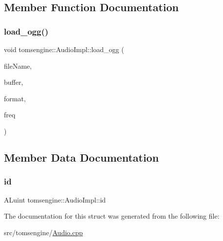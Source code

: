 \subsection{Member Function Documentation}
\mbox{\label{structtomsengine_1_1_audio_impl_a95a18a49f4741b70d83adfde334be19a}} 
\subsubsection{\texorpdfstring{load\+\_\+ogg()}{load\_ogg()}}
{\footnotesize\ttfamily void tomsengine\+::\+Audio\+Impl\+::load\+\_\+ogg (\begin{DoxyParamCaption}\item[{std\+::string}]{file\+Name,  }\item[{std\+::vector$<$ char $>$ \&}]{buffer,  }\item[{A\+Lenum \&}]{format,  }\item[{A\+Lsizei \&}]{freq }\end{DoxyParamCaption})\hspace{0.3cm}{\ttfamily [inline]}}



\subsection{Member Data Documentation}
\mbox{\label{structtomsengine_1_1_audio_impl_a24617361b934b7429242f1eb24692b09}} 
\subsubsection{\texorpdfstring{id}{id}}
{\footnotesize\ttfamily A\+Luint tomsengine\+::\+Audio\+Impl\+::id}



The documentation for this struct was generated from the following file\+:\begin{DoxyCompactItemize}
\item 
src/tomsengine/\mbox{\hyperlink{_audio_8cpp}{Audio.\+cpp}}\end{DoxyCompactItemize}

